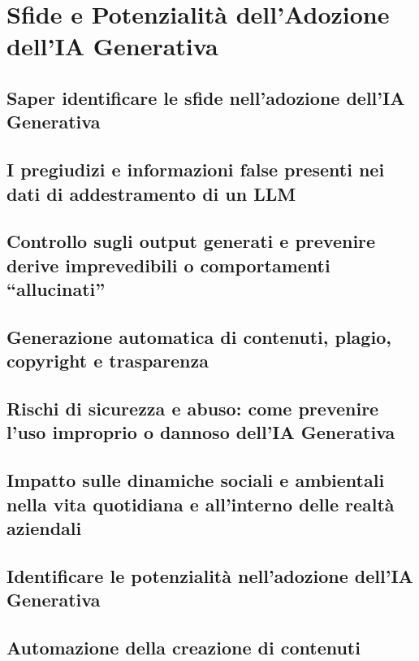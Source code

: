 \section{Sfide e Potenzialità dell'Adozione dell'IA Generativa}
    
    \subsection{Saper identificare le sfide nell'adozione dell'IA Generativa}
    
    \subsection{I pregiudizi e informazioni false presenti nei dati di addestramento di un LLM}
    
    \subsection{Controllo sugli output generati e prevenire derive imprevedibili o comportamenti ``allucinati''}
    
    \subsection{Generazione automatica di contenuti, plagio, copyright e trasparenza}
    
    \subsection{Rischi di sicurezza e abuso: come prevenire l'uso improprio o dannoso dell'IA Generativa}
    
    \subsection{Impatto sulle dinamiche sociali e ambientali nella vita quotidiana e all'interno delle realtà aziendali}
    
    \subsection{Identificare le potenzialità nell'adozione dell'IA Generativa}
    
    \subsection{Automazione della creazione di contenuti}
    
